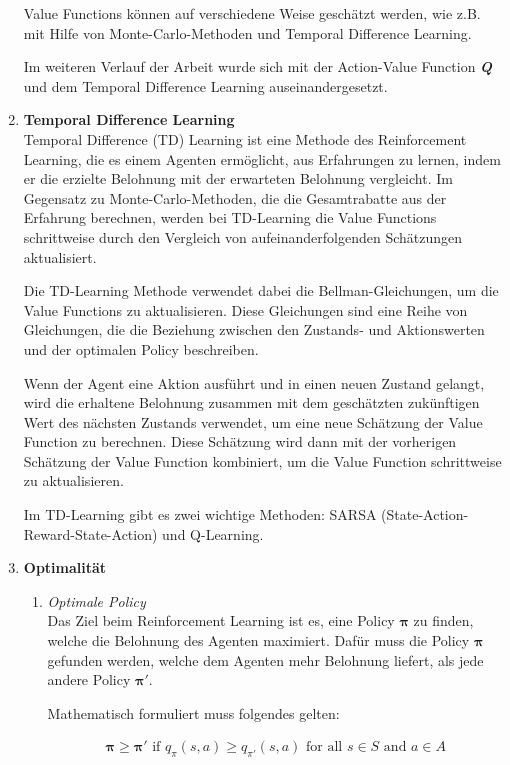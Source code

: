 \begin{enumerate}
    Value Functions können auf verschiedene Weise geschätzt werden, wie z.B. mit Hilfe von Monte-Carlo-Methoden und Temporal Difference Learning.

    Im weiteren Verlauf der Arbeit wurde sich mit der Action-Value Function \textbf{\textit{Q}} und dem Temporal Difference Learning auseinandergesetzt.
    
    \item \textbf{Temporal Difference Learning}\\
    Temporal Difference (TD) Learning ist eine Methode des Reinforcement Learning, die es einem Agenten ermöglicht, aus Erfahrungen zu lernen, indem er die erzielte Belohnung mit der erwarteten Belohnung vergleicht. Im Gegensatz zu Monte-Carlo-Methoden, die die Gesamtrabatte aus der Erfahrung berechnen, werden bei TD-Learning die Value Functions schrittweise durch den Vergleich von aufeinanderfolgenden Schätzungen aktualisiert.

    Die TD-Learning Methode verwendet dabei die Bellman-Gleichungen, um die Value Functions zu aktualisieren. Diese Gleichungen sind eine Reihe von Gleichungen, die die Beziehung zwischen den Zustands- und Aktionswerten und der optimalen Policy beschreiben.

    Wenn der Agent eine Aktion ausführt und in einen neuen Zustand gelangt, wird die erhaltene Belohnung zusammen mit dem geschätzten zukünftigen Wert des nächsten Zustands verwendet, um eine neue Schätzung der Value Function zu berechnen. Diese Schätzung wird dann mit der vorherigen Schätzung der Value Function kombiniert, um die Value Function schrittweise zu aktualisieren.

    Im TD-Learning gibt es zwei wichtige Methoden: SARSA (State-Action-Reward-State-Action) und Q-Learning.

    \item \textbf{Optimalität}\\
    \begin{enumerate}
        \item \textit{Optimale Policy}\\
        Das Ziel beim Reinforcement Learning ist es, eine Policy {$\bm{\pi}$} zu finden, welche die Belohnung des Agenten maximiert. Dafür muss die Policy {$\bm{\pi}$} gefunden werden, welche dem Agenten mehr Belohnung liefert, als jede andere Policy {$\bm{\pi'}$}.
        
        Mathematisch formuliert muss folgendes gelten:

        \begin{align}
            \bm{\pi} \geq \bm{\pi'}\text{ if } q_{\pi}(s,a) \geq  q_{\pi'}(s,a)\text{ for all } s \in S \text{ and } a \in A
        \end{align}


\end{enumerate}
\end{enumerate}
